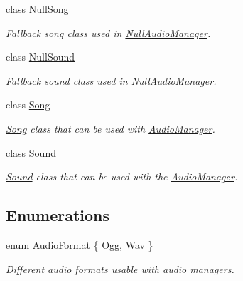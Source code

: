 \begin{DoxyCompactItemize}
class \hyperlink{class_tri_devs_1_1_tri_engine2_d_1_1_audio_1_1_null_song}{Null\-Song}
\begin{DoxyCompactList}\small\item\em Fallback song class used in \hyperlink{class_tri_devs_1_1_tri_engine2_d_1_1_audio_1_1_null_audio_manager}{Null\-Audio\-Manager}. \end{DoxyCompactList}\item 
class \hyperlink{class_tri_devs_1_1_tri_engine2_d_1_1_audio_1_1_null_sound}{Null\-Sound}
\begin{DoxyCompactList}\small\item\em Fallback sound class used in \hyperlink{class_tri_devs_1_1_tri_engine2_d_1_1_audio_1_1_null_audio_manager}{Null\-Audio\-Manager}. \end{DoxyCompactList}\item 
class \hyperlink{class_tri_devs_1_1_tri_engine2_d_1_1_audio_1_1_song}{Song}
\begin{DoxyCompactList}\small\item\em \hyperlink{class_tri_devs_1_1_tri_engine2_d_1_1_audio_1_1_song}{Song} class that can be used with \hyperlink{class_tri_devs_1_1_tri_engine2_d_1_1_audio_1_1_audio_manager}{Audio\-Manager}. \end{DoxyCompactList}\item 
class \hyperlink{class_tri_devs_1_1_tri_engine2_d_1_1_audio_1_1_sound}{Sound}
\begin{DoxyCompactList}\small\item\em \hyperlink{class_tri_devs_1_1_tri_engine2_d_1_1_audio_1_1_sound}{Sound} class that can be used with the \hyperlink{class_tri_devs_1_1_tri_engine2_d_1_1_audio_1_1_audio_manager}{Audio\-Manager}. \end{DoxyCompactList}\end{DoxyCompactItemize}
\subsection*{Enumerations}
\begin{DoxyCompactItemize}
\item 
enum \hyperlink{namespace_tri_devs_1_1_tri_engine2_d_1_1_audio_ae238794863562d9b6204219dd29019ff}{Audio\-Format} \{ \hyperlink{namespace_tri_devs_1_1_tri_engine2_d_1_1_audio_ae238794863562d9b6204219dd29019ffa7a99342f8dcbdacd3ed66edf2add143d}{Ogg}, 
\hyperlink{namespace_tri_devs_1_1_tri_engine2_d_1_1_audio_ae238794863562d9b6204219dd29019ffa0bc5cdc666c1935c50d8ece1b53edbc4}{Wav}
 \}
\begin{DoxyCompactList}\small\item\em Different audio formats usable with audio managers. \end{DoxyCompactList}\end{DoxyCompactItemize}


